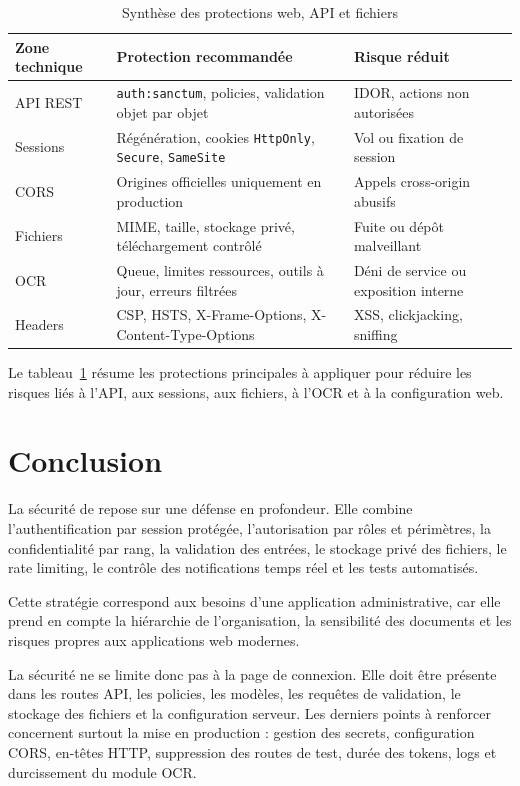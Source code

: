 \begin{table}[H]
\centering
\small
\begin{tabularx}{\textwidth}{lXl}
\toprule
\textbf{Zone technique} & \textbf{Protection recommandée} & \textbf{Risque réduit} \\
\midrule
API REST & \texttt{auth:sanctum}, policies, validation objet par objet & IDOR, actions non autorisées \\
Sessions & Régénération, cookies \texttt{HttpOnly}, \texttt{Secure}, \texttt{SameSite} & Vol ou fixation de session \\
CORS & Origines officielles uniquement en production & Appels cross-origin abusifs \\
Fichiers & MIME, taille, stockage privé, téléchargement contrôlé & Fuite ou dépôt malveillant \\
OCR & Queue, limites ressources, outils à jour, erreurs filtrées & Déni de service ou exposition interne \\
Headers & CSP, HSTS, X-Frame-Options, X-Content-Type-Options & XSS, clickjacking, sniffing \\
\bottomrule
\end{tabularx}
\caption{Synthèse des protections web, API et fichiers}
\label{tab:protections-web}
\end{table}

Le tableau~\ref{tab:protections-web} résume les protections principales à appliquer pour réduire les risques liés à l'API, aux sessions, aux fichiers, à l'OCR et à la configuration web.

\section{Conclusion}
\label{sec:securite-conclusion}

La sécurité de \SecurityAppName{} repose sur une défense en profondeur. Elle combine l'authentification par session protégée, l'autorisation par rôles et périmètres, la confidentialité par rang, la validation des entrées, le stockage privé des fichiers, le rate limiting, le contrôle des notifications temps réel et les tests automatisés.

Cette stratégie correspond aux besoins d'une application administrative, car elle prend en compte la hiérarchie de l'organisation, la sensibilité des documents et les risques propres aux applications web modernes.

La sécurité ne se limite donc pas à la page de connexion. Elle doit être présente dans les routes API, les policies, les modèles, les requêtes de validation, le stockage des fichiers et la configuration serveur. Les derniers points à renforcer concernent surtout la mise en production : gestion des secrets, configuration CORS, en-têtes HTTP, suppression des routes de test, durée des tokens, logs et durcissement du module OCR.
